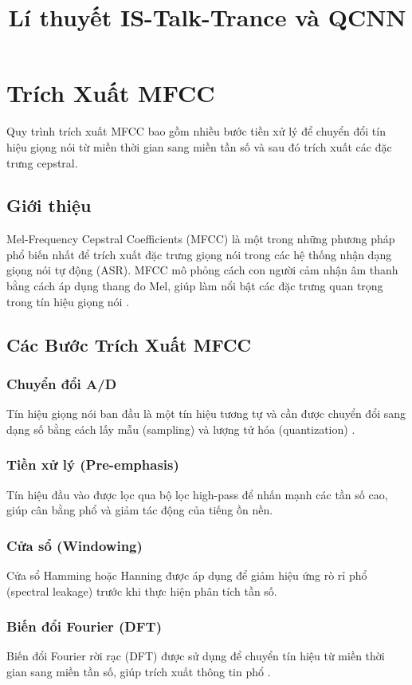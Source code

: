 \documentclass{article}
\title{Lí thuyết IS-Talk-Trance và QCNN}
\author{}
\date{}
\begin{document}
\maketitle

\section{Trích Xuất MFCC}
Quy trình trích xuất MFCC bao gồm nhiều bước tiền xử lý để chuyển đổi tín hiệu giọng nói từ miền thời gian sang miền tần số và sau đó trích xuất các đặc trưng cepstral.

\subsection{Giới thiệu}
Mel-Frequency Cepstral Coefficients (MFCC) là một trong những phương pháp phổ biến nhất để trích xuất đặc trưng giọng nói trong các hệ thống nhận dạng giọng nói tự động (ASR). MFCC mô phỏng cách con người cảm nhận âm thanh bằng cách áp dụng thang đo Mel, giúp làm nổi bật các đặc trưng quan trọng trong tín hiệu giọng nói \cite{davis1980comparison}.

\subsection{Các Bước Trích Xuất MFCC}
\subsubsection{Chuyển đổi A/D}
Tín hiệu giọng nói ban đầu là một tín hiệu tương tự và cần được chuyển đổi sang dạng số bằng cách lấy mẫu (sampling) và lượng tử hóa (quantization) \cite{oppenheim1999discrete}.

\subsubsection{Tiền xử lý (Pre-emphasis)}
Tín hiệu đầu vào được lọc qua bộ lọc high-pass để nhấn mạnh các tần số cao, giúp cân bằng phổ và giảm tác động của tiếng ồn nền.

\subsubsection{Cửa sổ (Windowing)}
Cửa sổ Hamming hoặc Hanning được áp dụng để giảm hiệu ứng rò rỉ phổ (spectral leakage) trước khi thực hiện phân tích tần số.

\subsubsection{Biến đổi Fourier (DFT)}
Biến đổi Fourier rời rạc (DFT) được sử dụng để chuyển tín hiệu từ miền thời gian sang miền tần số, giúp trích xuất thông tin phổ \cite{rabiner1993fundamentals}.
\end{document}
